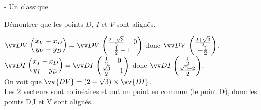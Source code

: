 \documentclass[11pt,a4paper]{article}  %
\begin{document}
\begin{exercice}{ - Un classique}
\begin{enumMet}[resume]
\begin{corrBox}
			\end{corrBox}
			\item Démontrer que les points $D$, $I$ et $V$ sont alignés.
			\begin{corrBox}
				$\Coord{DV}{x_V-x_D}{y_V-y_D}=\Coord{DV}{\frac{2+\sqrt{3}}{2}-0}{\frac{1}{2}-1}$ donc $\Coord{DV}{\frac{2+\sqrt{3}}{2}}{-\frac{1}{2}}$.\\
				$\Coord{DI}{x_I-x_D}{y_I-y_D}=\Coord{DI}{\frac{1}{2}-0}{\frac{\sqrt{3}}{2}-1}$ donc $\Coord{DI}{\frac{1}{2}}{\frac{\sqrt{3}-2}{2}}$.\\
				On voit que $\vv{DV}=(2+\sqrt{3})\times \vv{DI}$.\\
				Les 2 vecteurs sont colinéaires et ont un point en commun (le point D), donc les points D,I et V sont alignés.	
			\end{corrBox}
		\end{enumMet} 

\end{exercice}
\end{document}
